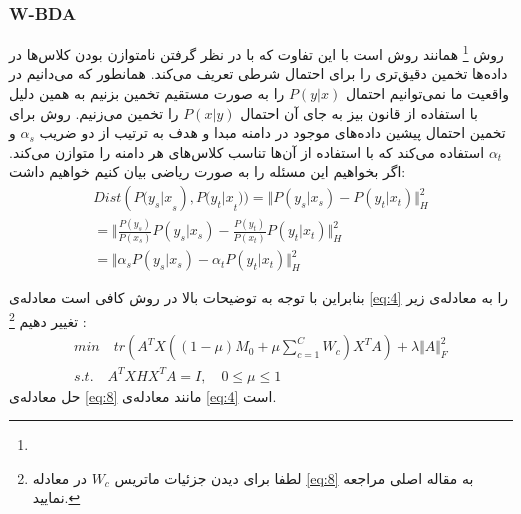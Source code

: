 {{	 	\subsubsection{W-BDA}
	 	{
	 		روش 
	 		\footnote{}
	 		همانند روش 
	 		است با این تفاوت که با در نظر گرفتن نامتوازن بودن کلاس‌ها در داده‌ها تخمین دقیق‌تری را برای احتمال شرطی تعریف می‌کند.  همانطور که می‌دانیم در واقعیت ما نمی‌توانیم احتمال 
	 		$P(y|x)$
	 		را به صورت مستقیم تخمین بزنیم به همین دلیل با استفاده از قانون بیز به جای آن احتمال 
	 		$P(x|y)$
	 		را تخمین می‌زنیم. روش 
	 		برای تخمین احتمال پیشین داده‌های موجود در دامنه مبدا و هدف به ترتیب از دو ضریب 
	 		$\alpha_s$
	 		و 
	 		$\alpha_t$
	 	  استفاده می‌کند که با استفاده از آن‌ها تناسب کلاس‌های هر دامنه را متوازن می‌کند. اگر بخواهیم این مسئله را به صورت ریاضی بیان کنیم خواهیم داشت:
	 		\begin{equation}
	 		\begin{aligned}
	 		Dist({P(y_s|x}_s),{P(y_t|x}_t))= \Vert P \left( y_{s} \vert x_{s} \right)  -P \left( y_{t} \vert x_{t} \right) \Vert  _{H}^{2}\\
	 		= \bigg \Vert \frac{P \left( y_{s} \right) }{P \left( x_{s} \right) }P \left( y_{s} \vert x_{s} \right)  -\frac{P \left( y_{t} \right) }{P \left( x_{t} \right) }P \left( y_{t} \vert x_{t} \right) \bigg \Vert  _{H}^{2}\quad \quad \quad \quad \quad\\
	 		= \Vert \alpha _{s}P \left( y_{s} \vert x_{s} \right)  - \alpha _{t}P \left( y_{t} \vert x_{t} \right)  \Vert  _{H}^{2} \quad \quad \quad \quad \quad \quad \quad \quad \quad 
	 		\end{aligned}
	 		\label{eq:7}
	 		\end{equation}
	 		
	 		بنابراین با توجه به توضیحات بالا در روش 
	 		کافی است معادله‌ی 
	 		\ref{eq:4}
	 		را به معادله‌ی زیر تغییر دهیم
	 		\footnote{
	 			لطفا برای دیدن جزئیات ماتریس
	 			 $W_{c}$  
	 			 در معادله
	 			 \ref{eq:8}
	 			  به مقاله اصلی مراجعه نمایید. }
	 		:
	 		\begin{equation}
	 		\begin{aligned}
	 		min \quad tr \left( A^{T}X \left( \left( 1 - \mu \right) M_{0} + \mu \sum _{c=1\mathrm{ }}^{C}W_{c} \right) X^{T}A \right) + \lambda \Vert A \Vert_{F}^{2} \\
	 		s.t. \quad A^{T}XHX^{T}A = I, \quad  0  \leq \mu \leq  1 \quad \quad \quad \quad \quad
	 		\label{eq:8}
	 		\end{aligned}
	 		\end{equation}
	 		حل معادله‌ی 
	 		\ref{eq:8}
	 		مانند معادله‌ی 
	 		\ref{eq:4}
	 		است.
	 	
}}}
